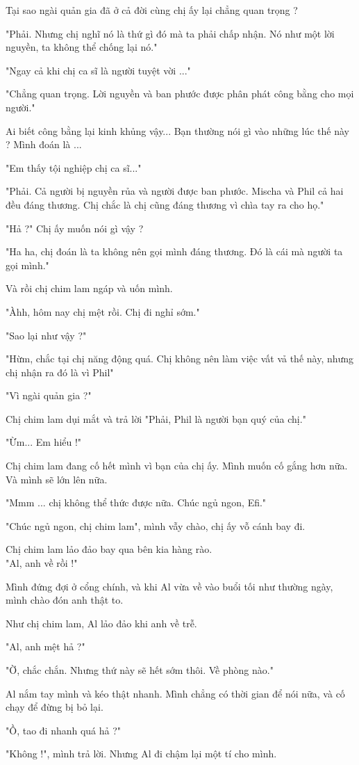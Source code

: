  Tại sao ngài quản gia đã ở cả đời cùng chị ấy lại chẳng quan trọng ?
 
 "Phải. Nhưng chị nghĩ nó là thứ gì đó mà ta phải chấp nhận. Nó như một lời nguyền, ta không thể chống lại nó."
 
 "Ngay cả khi chị ca sĩ là người tuyệt vời ..."
 
 "Chẳng quan trọng. Lời nguyền và ban phước được phân phát công bằng cho mọi người."
 
 Ai biết công bằng lại kinh khủng vậy... Bạn thường nói gì vào những lúc thế này ? Mình đoán là ... 
 
 "Em thấy tội nghiệp chị ca sĩ..."
 
 "Phải. Cả người bị nguyền rủa và người được ban phước. Mischa và Phil cả hai đều đáng thương. Chị chắc là chị cũng đáng thương vì chìa tay ra cho họ."
 
 "Hả ?" Chị ấy muốn nói gì vậy ?
 
 "Ha ha, chị đoán là ta không nên gọi mình đáng thương. Đó là cái mà người ta gọi mình."
 
 Và rồi chị chim lam ngáp và uốn mình.

 "Àhh, hôm nay chị mệt rồi. Chị đi nghỉ sớm."
 
 "Sao lại như vậy ?"
 
 "Hừm, chắc tại chị năng động quá. Chị không nên làm việc vất vả thế này, nhưng chị nhận ra đó là vì Phil"
 
 "Vì ngài quản gia ?"
 
 Chị chim lam dụi mắt và trả lời "Phải, Phil là người bạn quý của chị." 
 
 "Ừm... Em hiểu !"
 
 Chị chim lam đang cố hết mình vì bạn của chị ấy. Mình muốn cố gắng hơn nữa. Và mình sẽ lớn lên nữa.
 
 "Mmm ... chị không thể thức được nữa. Chúc ngủ ngon, Efi."
 
 "Chúc ngủ ngon, chị chim lam", mình vẫy chào, chị ấy vỗ cánh bay đi.
 
 Chị chim lam lảo đảo bay qua bên kia hàng rào. \\
 
 
 "Al, anh về rồi !"
 
 Mình đứng đợi ở cổng chính, và khi Al vừa về vào buổi tối như thường ngày, mình chào đón anh thật to.
 
 Như chị chim lam, Al lảo đảo khi anh về trễ.
 
 "Al, anh mệt hả ?"
 
 "Ờ, chắc chắn. Nhưng thứ này sẽ hết sớm thôi. Về phòng nào."
 
 Al nắm tay mình và kéo thật nhanh. Mình chẳng có thời gian để nói nữa, và cố chạy để đừng bị bỏ lại.
 
 "Ồ, tao đi nhanh quá hả ?"
 
 "Không !", mình trả lời. Nhưng Al đi chậm lại một tí cho mình.
 
 